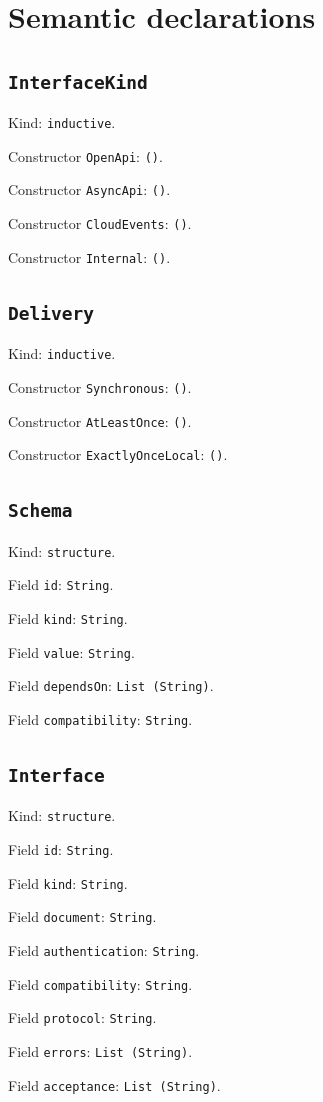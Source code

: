 \documentclass[11pt]{article}
\begin{document}
\section*{Semantic declarations}
\subsection*{\texttt{InterfaceKind}}
\noindent Kind: \texttt{inductive}.\par
\noindent Constructor \texttt{OpenApi}: \texttt{()}.\par
\noindent Constructor \texttt{AsyncApi}: \texttt{()}.\par
\noindent Constructor \texttt{CloudEvents}: \texttt{()}.\par
\noindent Constructor \texttt{Internal}: \texttt{()}.\par
\subsection*{\texttt{Delivery}}
\noindent Kind: \texttt{inductive}.\par
\noindent Constructor \texttt{Synchronous}: \texttt{()}.\par
\noindent Constructor \texttt{AtLeastOnce}: \texttt{()}.\par
\noindent Constructor \texttt{ExactlyOnceLocal}: \texttt{()}.\par
\subsection*{\texttt{Schema}}
\noindent Kind: \texttt{structure}.\par
\noindent Field \texttt{id}: \texttt{String}.\par
\noindent Field \texttt{kind}: \texttt{String}.\par
\noindent Field \texttt{value}: \texttt{String}.\par
\noindent Field \texttt{dependsOn}: \texttt{List (String)}.\par
\noindent Field \texttt{compatibility}: \texttt{String}.\par
\subsection*{\texttt{Interface}}
\noindent Kind: \texttt{structure}.\par
\noindent Field \texttt{id}: \texttt{String}.\par
\noindent Field \texttt{kind}: \texttt{String}.\par
\noindent Field \texttt{document}: \texttt{String}.\par
\noindent Field \texttt{authentication}: \texttt{String}.\par
\noindent Field \texttt{compatibility}: \texttt{String}.\par
\noindent Field \texttt{protocol}: \texttt{String}.\par
\noindent Field \texttt{errors}: \texttt{List (String)}.\par
\noindent Field \texttt{acceptance}: \texttt{List (String)}.\par
\end{document}
